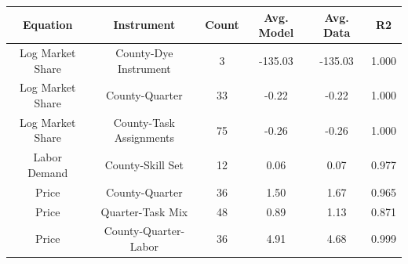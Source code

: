 
\centering
\begin{tabular}[t]{cccccc}
\toprule
Equation & Instrument & Count & Avg. Model & Avg. Data & R2\\
\midrule
Log Market Share & County-Dye Instrument & 3 & -135.03 & -135.03 & 1.000\\
Log Market Share & County-Quarter & 33 & -0.22 & -0.22 & 1.000\\
Log Market Share & County-Task Assignments & 75 & -0.26 & -0.26 & 1.000\\
Labor Demand & County-Skill Set & 12 & 0.06 & 0.07 & 0.977\\
Price & County-Quarter & 36 & 1.50 & 1.67 & 0.965\\
Price & Quarter-Task Mix & 48 & 0.89 & 1.13 & 0.871\\
Price & County-Quarter-Labor & 36 & 4.91 & 4.68 & 0.999\\
\bottomrule
\end{tabular}